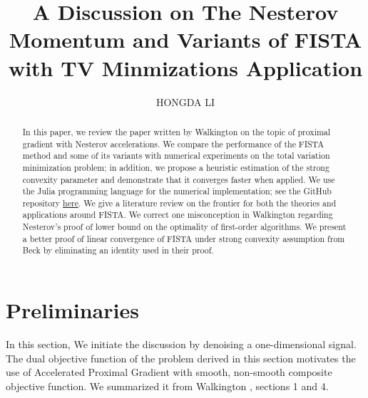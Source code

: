 \documentclass[]{article}
\title{A Discussion on The Nesterov Momentum and Variants of FISTA with TV Minmizations Application}
\author{HONGDA LI}
\theoremstyle{definition}
\numberwithin{equation}{subsection}
\begin{document}
\maketitle

\begin{abstract}
    In this paper, we review the paper written by Walkington \cite{noel_nesterovs_nodate} on the topic of proximal gradient with Nesterov accelerations. 
    We compare the performance of the FISTA method and some of its variants with numerical experiments on the total variation minimization problem; in addition, we propose a heuristic estimation of the strong convexity parameter and demonstrate that it converges faster when applied. 
    We use the Julia programming language \cite{bezanson_julia_2017} for the numerical implementation; see the GitHub repository \href{https://github.com/iluvjava/Proximal-Gradient/tree/main/applications}{here}.
    We give a literature review on the frontier for both the theories and applications around FISTA. 
    We correct one misconception in Walkington \cite{noel_nesterovs_nodate} regarding Nesterov's proof of lower bound on the optimality of first-order algorithms. 
    We present a better proof of linear convergence of FISTA under strong convexity assumption from Beck \cite[theorem 10.7.7]{beck_first-order_nodate} by eliminating an identity used in their proof. 
\end{abstract}


\section{Preliminaries}\label{sec:preliminaries}
    In this section, We initiate the discussion by denoising a one-dimensional signal. 
    The dual objective function of the problem derived in this section motivates the use of Accelerated Proximal Gradient with smooth, non-smooth composite objective function.
    We summarized it from Walkington \cite{noel_nesterovs_nodate}, sections 1 and 4. 
\end{document}
